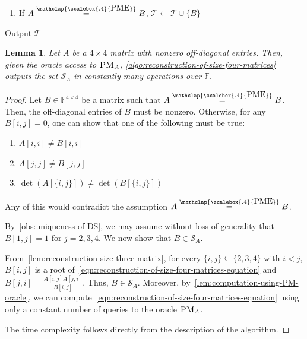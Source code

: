 \documentclass[11pt,letterpaper]{article}
\newcommand{\sgc}[1]{\textcolor{orange}{\guillemotleft \textbf{Sumanta:} #1\guillemotright}}
\newcommand{\F}{\mathbb{F}}
\newtheorem{lemma}{Lemma}[section]
\newtheorem{definition}{Definition}[section]
\newcommand{\PME}{\stackrel{\mathclap{\scalebox{.4}{\mbox{PME}}}}{=}}
\renewcommand{\vec}[1]{\mathbf{#1}}
\newcommand{\PMoracle}[1]{\textsc{PM}_{#1}}
\newcommand{\polyPMoracle}[1]{\textsc{polynomial-PM}_{#1}}
\newcommand{\fourPMEfamily}[1]{\mathcal{S}_{#1}}
\begin{document}
{{{\begin{algorithm}[H]
\begin{algorithmic}[1]
\begin{enumerate}[label=\roman*)]
\begin{itemize}
 \item for $\{i, j\}\subseteq \{1,2,3,4\}$ with $i<j$, $B[j,i]\leftarrow\frac{A[i,j]A[j,i]}{B[i,j]}$
 \end{itemize}
\item If $A\PME B$, $\mathcal T\leftarrow \mathcal T\cup\{B\}$
\end{enumerate}
\State Output $\mathcal T$
\end{algorithmic}
\end{algorithm}
\begin{lemma}
\label{lem:reconstruction-of-size-four-matrices}
Let $A$ be a $4\times 4$ matrix with nonzero off-diagonal entries. Then, given the oracle access to $\PMoracle{A}$, \cref{algo:reconstruction-of-size-four-matrices} outputs the set $\fourPMEfamily{A}$ in constantly many operations over $\F$.
\end{lemma}
\begin{proof}
Let $B\in\F^{4\times 4}$ be a matrix such that $A\PME B$. Then, the off-diagonal entries of $B$ must be nonzero. Otherwise, for any $B[i,j]=0$, one can show that one of the following must be true:
\begin{enumerate}
\item $A[i,i]\neq B[i,i]$
\item $A[j, j]\neq B[j, j]$
\item $\det(A[\{i,j\}])\neq \det(B[\{i,j\}])$
\end{enumerate}
 Any of this would contradict the assumption $A\PME B$. 
 
 By~\cref{obs:uniqueness-of-DS}, we may assume without loss of generality that $B[1,j]=1$ for $j=2,3,4$. We now show that $B\in \fourPMEfamily{A}$. 

From~\cref{lem:reconstruction-size-three-matrix}, for every $\{i,j\}\subseteq \{2,3,4\}$ with $i<j$, $B[i,j]$ is a root of~\cref{eqn:reconstruction-of-size-four-matrices-equation} and $B[j, i]=\frac{A[i,j]A[j,i]}{B[i,j]}$. Thus, $B\in \fourPMEfamily{A}$. Moreover, by~\cref{lem:computation-using-PM-oracle}, we can compute~\cref{eqn:reconstruction-of-size-four-matrices-equation} using only a constant number of queries to the oracle $\PMoracle{A}$. 

The time complexity follows directly from the description of the algorithm. 
\end{proof}


}}}
\end{document}

